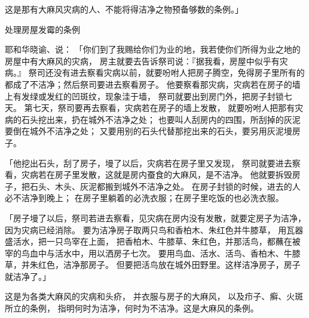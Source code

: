 {这是那有大麻风灾病的人、不能将{}得洁净之物预备够数的条例。」
\par }{\SH 处理房屋发霉的条例
\par }{\PP {}耶和华晓谕{}、{}说：
「你们到了我赐给你们为业的{}地，我若使你们所得为业之地的房屋中有大麻风的灾病，
房主就要去告诉祭司说：『据我看，房屋中似乎有灾病。』
祭司还没有进去察看灾病以前，就要吩咐人把房子腾空，免得房子里所有的都成了不洁净；然后祭司要进去察看房子。
他要察看那灾病，灾病若在房子的墙上有发绿或发红的凹斑纹，现象洼于墙，
祭司就要出到房门外，把房子封锁七天。
第七天，祭司要再去察看，灾病若在房子的墙上发散，
就要吩咐人把那有灾病的石头挖出来，扔在城外不洁净之处；
也要叫人刮房内的四围，所刮掉的灰泥要倒在城外不洁净之处；
又要用别的石头代替那挖出来的石头，要另用灰泥墁房子。
\par }{\PP {}「他挖出石头，刮了房子，墁了以后，灾病若在房子里又发现，
祭司就要进去察看，灾病若在房子里发散，这就是房内蚕食的大麻风，是不洁净。
他就要拆毁房子，把石头、木头、灰泥都搬到城外不洁净之处。
在房子封锁的时候，进去的人必不洁净到晚上；
在房子里躺着的必洗衣服；在房子里吃饭的也必洗衣服。
\par }{\PP {}「房子墁了以后，祭司若进去察看，见灾病在房内没有发散，就要定房子为洁净，因为灾病已经消除。
要为洁净房子取两只鸟和香柏木、朱红色{}并牛膝草，
用瓦器盛活水，把一只鸟宰在上面，
把香柏木、牛膝草、朱红色{}，并那活鸟，都蘸在被宰的鸟血中与活水中，用以洒房子七次。
要用鸟血、活水、活鸟、香柏木、牛膝草，并朱红色{}，洁净那房子。
但要把活鸟放在城外田野里。这样洁净房子，房子就洁净了。」
\par }{\PP {}这是为各类大麻风的灾病和头疥，
并衣服与房子的大麻风，
以及疖子、癣、火斑所立的条例，
指明何时为洁净，何时为不洁净。这是大麻风的条例。

}
